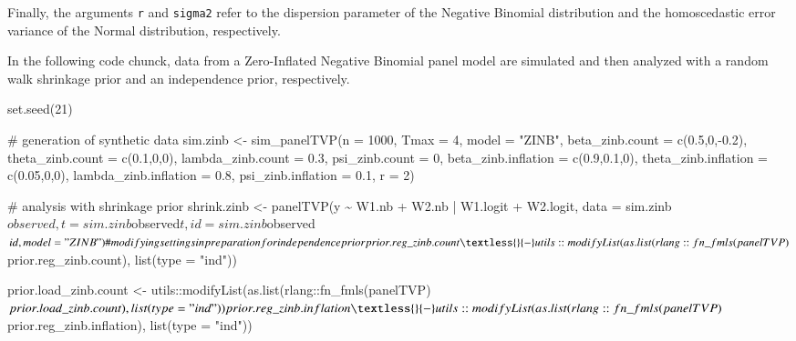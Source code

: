 \documentclass[a4paper, preprint, 3p,
authoryear]{elsarticle} %
\newenvironment{Shaded}{\begin{snugshade}}{\end{snugshade}}
\newcommand{\NormalTok}[1]{#1}
\begin{document}
Finally, the arguments \texttt{r} and \texttt{sigma2} refer to the
dispersion parameter of the Negative Binomial distribution and the
homoscedastic error variance of the Normal distribution, respectively.

In the following code chunck, data from a Zero-Inflated Negative
Binomial panel model are simulated and then analyzed with a random walk
shrinkage prior and an independence prior, respectively.

\begin{Shaded}
\begin{Highlighting}[]
\NormalTok{set.seed(21)}

\NormalTok{\# generation of synthetic data}
\NormalTok{sim.zinb \textless{}{-} sim\_panelTVP(n = 1000, Tmax = 4, model = "ZINB",}
\NormalTok{                         beta\_zinb.count = c(0.5,0,{-}0.2),}
\NormalTok{                         theta\_zinb.count = c(0.1,0,0),}
\NormalTok{                         lambda\_zinb.count = 0.3,}
\NormalTok{                         psi\_zinb.count = 0,}
\NormalTok{                         beta\_zinb.inflation = c(0.9,0.1,0),}
\NormalTok{                         theta\_zinb.inflation = c(0.05,0,0),}
\NormalTok{                         lambda\_zinb.inflation = 0.8,}
\NormalTok{                         psi\_zinb.inflation = 0.1,}
\NormalTok{                         r = 2)}

\NormalTok{\# analysis with shrinkage prior}
\NormalTok{shrink.zinb \textless{}{-} panelTVP(y \textasciitilde{} W1.nb + W2.nb | W1.logit + W2.logit,}
\NormalTok{                        data = sim.zinb$observed,}
\NormalTok{                        t = sim.zinb$observed$t,}
\NormalTok{                        id = sim.zinb$observed$id,}
\NormalTok{                        model = "ZINB")}

\NormalTok{\# modifying settings in preparation for independence prior}
\NormalTok{prior.reg\_zinb.count \textless{}{-}}
\NormalTok{  utils::modifyList(as.list(rlang::fn\_fmls(panelTVP)$prior.reg\_zinb.count),}
\NormalTok{                  list(type = "ind"))}

\NormalTok{prior.load\_zinb.count \textless{}{-}}
\NormalTok{  utils::modifyList(as.list(rlang::fn\_fmls(panelTVP)$prior.load\_zinb.count),}
\NormalTok{                  list(type = "ind"))}

\NormalTok{prior.reg\_zinb.inflation \textless{}{-}}
\NormalTok{  utils::modifyList(as.list(rlang::fn\_fmls(panelTVP)$prior.reg\_zinb.inflation),}
\NormalTok{                  list(type = "ind"))}


\end{Highlighting}
\end{Shaded}
\end{document}
